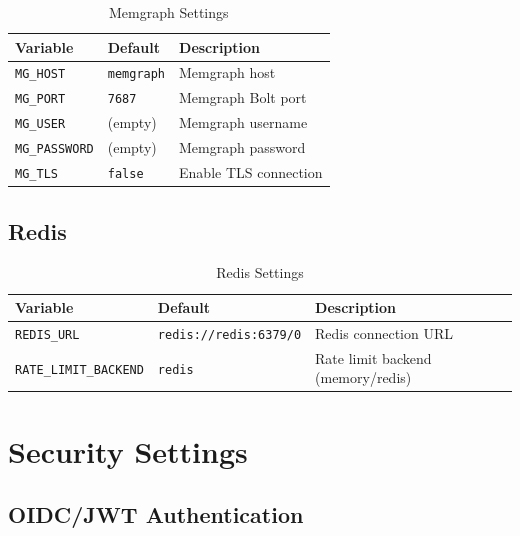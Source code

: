 \begin{table}[ht]
\centering
\caption{Memgraph Settings}
\label{tab:config-memgraph}
\small
\begin{tabularx}{\textwidth}{llX}
    \hline
    \textbf{Variable} & \textbf{Default} & \textbf{Description} \\
    \hline
    \texttt{MG\_HOST} & \texttt{memgraph} & Memgraph host \\
    \texttt{MG\_PORT} & \texttt{7687} & Memgraph Bolt port \\
    \texttt{MG\_USER} & (empty) & Memgraph username \\
    \texttt{MG\_PASSWORD} & (empty) & Memgraph password \\
    \texttt{MG\_TLS} & \texttt{false} & Enable TLS connection \\
    \hline
\end{tabularx}
\end{table}

\subsection{Redis}

\begin{table}[ht]
\centering
\caption{Redis Settings}
\label{tab:config-redis}
\small
\begin{tabularx}{\textwidth}{llX}
    \hline
    \textbf{Variable} & \textbf{Default} & \textbf{Description} \\
    \hline
    \texttt{REDIS\_URL} & \texttt{redis://redis:6379/0} & Redis connection URL \\
    \texttt{RATE\_LIMIT\_BACKEND} & \texttt{redis} & Rate limit backend (memory/redis) \\
    \hline
\end{tabularx}
\end{table}

\section{Security Settings}
\label{app:config:security}

\subsection{OIDC/JWT Authentication}

